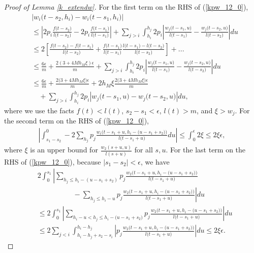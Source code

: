 \documentclass[10pt,a4paper]{amsart}
\begin{document}
\begin{proof}[Proof of Lemma \ref{k_extendw}]
For the first term on the RHS of (\ref{kpw_12_0}),
\begin{align}
&\left|w_i\big(t-s_2,h_i\big)- w_i\big(t-s_1,h_i\big)\right|\nonumber\\
&\leq\left|2p_i\frac{f\big(t-s_2\big)}{l\big(t-s_2\big)}-2p_i\frac{f\big(t-s_1\big)}{l\big(t-s_1\big)}\right|
+\sum_{j>i}\int_{ h_i}^{h_j}2p_i
\left|
\frac{w_j\big(t-s_1,u\big)}{l\big(t-s_1\big)}-\frac{w_j\big(t-s_2,u\big)}{l\big(t-s_2\big)}
\right| du
\nonumber\\
&\leq2\left[\frac{f\big(t-s_2\big)-f\big(t-s_1\big)}{l\big(t-s_2\big)}+\frac{f\big(t-s_1\big)}{l\big(t-s_1\big)}\frac{l\big(t-s_1\big)-l\big(t-s_2\big)}{l\big(t-s_2\big)}\right]+..\nonumber.\\
&\leq \frac{6\epsilon}{m}+\frac{2(3+4M h_M \xi)\epsilon}{m}
+\sum_{j>i}\int_{ h_i}^{h_j}2p_i
\left|
\frac{w_j\big(t-s_1,u\big)}{l\big(t-s_1\big)}-\frac{w_j\big(t-s_2,u\big)}{l\big(t-s_2\big)}
\right| du\nonumber\\
&\leq\frac{6\epsilon}{m}+\frac{2\big(3+4M h_M \xi\big)\epsilon}{m}+2h_M\xi \frac{2\big(3+4M h_M\xi\big)\epsilon}{m}\nonumber\\
&\quad+\sum_{j>i}\int_{ h_i}^{h_j}2p_i
\left|
w_j\big(t-s_1,u\big)-w_j\big(t-s_2,u\big)
\right|
du\label{kpw_12_1},
\end{align}
where we use the facts $f(t)<l(t)$, $s_2-s_1<\epsilon$, $l(t)>m$, and $\xi>w_j$. For the second term on the RHS of (\ref{kpw_12_0}),
\begin{align}
\left|\int_{s_1-s_2}^0-2 \sum_{h_j}p_j \frac{w_i\big(t-s_1+u,h_i-\big(u-s_1+s_2\big)\big)}{l\big(t-s_1+u\big)}du\right|\leq\int_{0}^{\epsilon}2\xi
\leq 2\xi\epsilon\label{kpw_12_2},
\end{align}
where $\xi$ is an upper bound for $\frac{w_2(s+u,u)}{l(s+u)}$ for all $s,u$. For the last term on the RHS of (\ref{kpw_12_0}), because $|s_1-s_2|<\epsilon$, we have
{
\begin{align} 
&2\int_{0}^{s_1} 
\left|
\sum_{h_j\leq h_i-(u-s_1+s_2)} p_j\frac{w_2\big(t-s_1+u,h_i-\big(u-s_1+s_2\big)\big)}{l\big(t-s_1+u\big)}\right.\nonumber\\
&\left.\quad\quad\quad\quad\quad
-\sum_{h_j\leq h_i-u} p_j\frac{w_2\big(t-s_1+u,h_i-\big(u-s_1+s_2\big)\big)}{l\big(t-s_1+u\big)} 
\right|
du\nonumber\\
&\leq 2\int_{0}^{s_1} 
\left|
\sum_{h_i-u <h_j\leq h_i-\big(u-s_1+s_2\big)} p_j\frac{w_2\big(t-s_1+u,h_i-\big(u-s_1+s_2\big)\big)}{l\big(t-s_1+u\big)} 
\right| 
du\nonumber\\
&\leq 2\sum_{j<i}\int_{h_i-h_j+s_2-s_i}^{h_i-h_j}
\left|
p_j\frac{w_2\big(t-s_1+u,h_i-\big(u-s_1+s_2\big)\big)}{l\big(t-s_1+u\big)} 
\right| 
du\leq 2 \xi \epsilon \label{kpw_12_4}.
\end{align}}


\end{proof}
\end{document}
